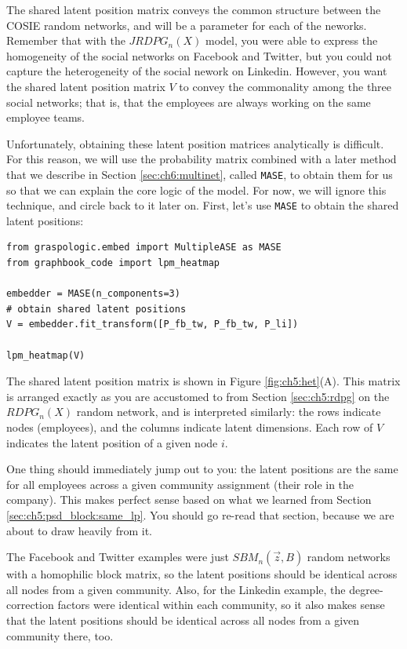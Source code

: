 The shared latent position matrix conveys the {common structure} between the COSIE random networks, and will be a parameter for each of the neworks. Remember that with the $JRDPG_n(X)$ model, you were able to express the homogeneity of the social networks on Facebook and Twitter, but you could not capture the heterogeneity of the social nework on Linkedin. However, you want the shared latent position matrix $V$ to convey the commonality among the three social networks; that is, that the employees are always working on the same employee teams. 

Unfortunately, obtaining these latent position matrices analytically is difficult. For this reason, we will use the probability matrix combined with a later method that we describe in Section \ref{sec:ch6:multinet}, called \texttt{MASE}, to obtain them for us so that we can explain the core logic of the model. For now, we will ignore this technique, and circle back to it later on. First, let's use \texttt{MASE} to obtain the shared latent positions:

\begin{lstlisting}[style=python]
from graspologic.embed import MultipleASE as MASE
from graphbook_code import lpm_heatmap

embedder = MASE(n_components=3)
# obtain shared latent positions
V = embedder.fit_transform([P_fb_tw, P_fb_tw, P_li])

lpm_heatmap(V)
\end{lstlisting}

The shared latent position matrix is shown in Figure \ref{fig:ch5:het}(A). This matrix is arranged exactly as you are accustomed to from Section \ref{sec:ch5:rdpg} on the $RDPG_n(X)$ random network, and is interpreted similarly: the rows indicate nodes (employees), and the columns indicate latent dimensions. Each row of $V$ indicates the latent position of a given node $i$.

One thing should immediately jump out to you: the latent positions are the {same} for all employees across a given community assignment (their role in the company). This makes perfect sense based on what we learned from Section \ref{sec:ch5:psd_block:same_lp}. You should go re-read that section, because we are about to draw heavily from it.

The Facebook and Twitter examples were just $SBM_n(\vec z, B)$ random networks with a homophilic block matrix, so the latent positions should be identical across all nodes from a given community. Also, for the Linkedin example, the degree-correction factors were identical within each community, so it also makes sense that the latent positions should be identical across all nodes from a given community there, too.

